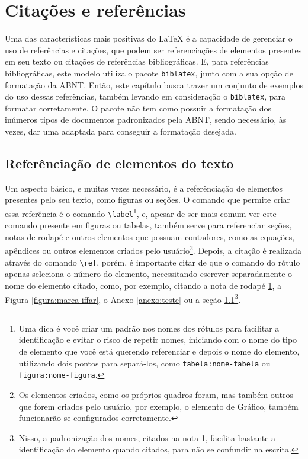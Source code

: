 \chapter{Citações e referências}
Uma das características mais positivas do \LaTeX{} é a capacidade de gerenciar o uso de referências e citações, que podem ser referenciações de elementos presentes em seu texto ou citações de referências bibliográficas. E, para referências bibliográficas\footnotemark, este modelo utiliza o pacote \verb|biblatex|, junto com a sua opção de formatação da ABNT. Então, este capítulo busca trazer um conjunto de exemplos do uso dessas referências, também levando em consideração o \verb|biblatex|, para formatar corretamente. O pacote não tem como possuir a formatação dos inúmeros tipos de documentos padronizados pela ABNT, sendo necessário, às vezes, dar uma adaptada para conseguir a formatação desejada.

\section{Referênciação de elementos do texto}\label{section:referencia}
Um aspecto básico, e muitas vezes necessário, é a referênciação de elementos presentes pelo seu texto, como figuras ou seções. O comando que permite criar essa referência é o comando \verb|\label|\footnote{\label{rodape:exemplo-ref}Uma dica é você criar um padrão nos nomes dos rótulos para facilitar a identificação e evitar o risco de repetir nomes, iniciando com o nome do tipo de elemento que você está querendo referenciar e depois o nome do elemento, utilizando dois pontos para separá-los, como \texttt{tabela:nome-tabela} ou \texttt{figura:nome-figura}.}, 
e, apesar de ser mais comum ver este comando presente em figuras ou tabelas, também serve para referenciar seções, notas de rodapé e outros elementos que possuam contadores, como as equações, apêndices ou outros elementos criados pelo usuário\footnote{Os elementos criados, como os próprios quadros foram, mas também outros que forem criados pelo usuário, por exemplo, o elemento de Gráfico, também funcionarão se configurados corretamente.}. 
Depois, a citação é realizada através do comando \verb|\ref|, porém, é importante citar de que o comando do rótulo apenas seleciona o número do elemento, necessitando escrever separadamente o nome do elemento citado, como, por exemplo, citando a nota de rodapé \ref{rodape:exemplo-ref}, a Figura \ref{figura:marca-iffar}, o Anexo \ref{anexo:teste} ou a seção \ref{section:referencia}\footnote{Nisso, a padronização dos nomes, citados na nota \ref{rodape:exemplo-ref}, facilita bastante a identificação do elemento quando citados, para não se confundir na escrita.}. %

